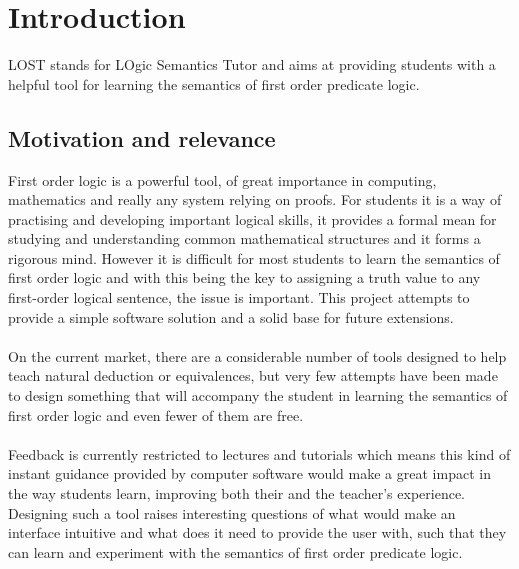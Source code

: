 \documentclass{report}
\begin{document}
\chapter{Introduction}

LOST stands for LOgic Semantics Tutor and aims at providing students with a 
helpful tool for learning the semantics of first order predicate logic.

\section{Motivation and relevance}
First order logic is a powerful tool, of great importance in computing, 
mathematics and really any system relying on proofs. For students it is a way of
practising and developing important logical skills, it provides a formal mean 
for studying and understanding common mathematical structures and it forms a 
rigorous mind. However it is difficult for most students to learn the semantics 
of first order logic and with this being the key to assigning a truth value to 
any first-order logical sentence, the issue is important. This project attempts 
to provide a simple software solution and a solid base for future extensions. 
\\ \\
On the current market, there are a considerable number of tools designed to help
teach natural deduction or equivalences, but very few attempts have been made 
to design something that will accompany the student in learning the semantics 
of first order logic and even fewer of them are free. 
\\ \\
Feedback is currently restricted to lectures and tutorials which means this kind 
of instant guidance provided by computer software would make a great impact in 
the way students learn, improving both their and the teacher's experience. 
Designing such a tool raises interesting questions of what would make an 
interface intuitive and what does it need to provide the user with, such that 
they can learn and experiment with the semantics of first order predicate logic.
\end{document}
